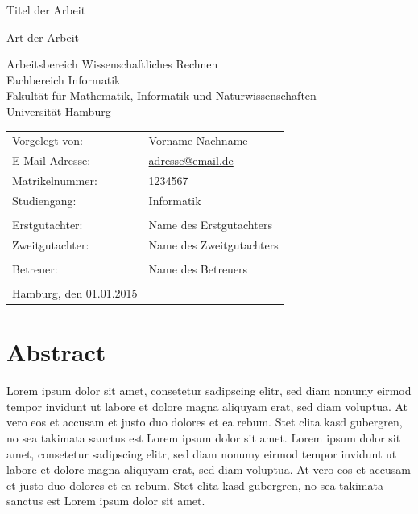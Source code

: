 \documentclass[
	12pt,
	a4paper,
	BCOR10mm,
	DIV14,
	headsepline,
]{scrreprt}
\begin{document}
\begin{titlepage}
	\begin{center}
		{\titlefont\huge Titel der Arbeit\par}

		\bigskip
		\bigskip

		{\Large Art der Arbeit\par}

		\bigskip
		\bigskip

		{\large Arbeitsbereich Wissenschaftliches Rechnen\\
		Fachbereich Informatik\\
		Fakultät für Mathematik, Informatik und Naturwissenschaften\\
		Universität Hamburg\par}
	\end{center}

	\vfill

	{\large\begin{tabular}{ll}
		Vorgelegt von:  & Vorname Nachname \\
		E-Mail-Adresse: & \href{mailto:adresse@email.de}{adresse@email.de} \\
		Matrikelnummer: & 1234567 \\
		Studiengang:    & Informatik \\
		\\
		Erstgutachter:  & Name des Erstgutachters \\
		Zweitgutachter: & Name des Zweitgutachters\\ \\
		Betreuer:       & Name des Betreuers \\
		\\
		Hamburg, den 01.01.2015
	\end{tabular}\par}
\end{titlepage}

\chapter*{Abstract}

\thispagestyle{empty}

Lorem ipsum dolor sit amet, consetetur sadipscing elitr, sed diam nonumy eirmod tempor invidunt ut labore et dolore magna aliquyam erat, sed diam voluptua.
At vero eos et accusam et justo duo dolores et ea rebum.
Stet clita kasd gubergren, no sea takimata sanctus est Lorem ipsum dolor sit amet.
Lorem ipsum dolor sit amet, consetetur sadipscing elitr, sed diam nonumy eirmod tempor invidunt ut labore et dolore magna aliquyam erat, sed diam voluptua.
At vero eos et accusam et justo duo dolores et ea rebum.
Stet clita kasd gubergren, no sea takimata sanctus est Lorem ipsum dolor sit amet.
\end{document}
